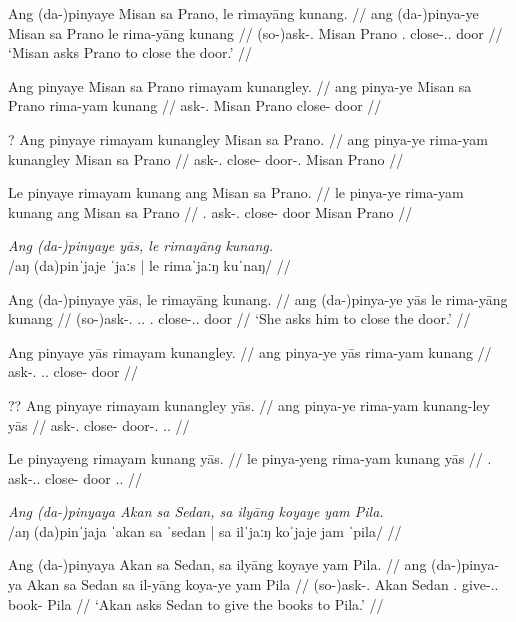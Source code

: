 \documentclass[12pt,a4paper]{scrartcl}
\newcommand{\PargI}{{\Parg}.{\Inan}}
\newcommand{\PatTI}{{\PatT}.{\Inan}}
\newcommand{\TsgM}{{\Tsg}.{\M}}
\newcommand{\TsgF}{{\Tsg}.{\F}}
\begin{document}
\gla Ang (da-)pinyaye Misan sa Prano, le rimayāng kunang. //
\glb ang (da-)pinya-ye Misan sa Prano le rima-yāng kunang //
\glc \AgtT{} (so-)ask-\TsgF{} Misan \Parg{} Prano \PatTI{} close-\TsgM{}.\Aarg{} door //
\glft `Misan asks Prano to close the door.' //
\endgl

\a\begingl
\gla Ang pinyaye Misan sa Prano rimayam kunangley. //
\glb ang pinya-ye Misan sa Prano rima-yam kunang //
\glc \AgtT{} ask-\TsgF{} Misan \Parg{} Prano close-\Ptcp{} door //
\endgl

\a\ljudge?\begingl
\gla Ang pinyaye rimayam kunangley Misan sa Prano. //
\glb ang pinya-ye rima-yam kunangley Misan sa Prano //
\glc \AgtT{} ask-\TsgF{} close-\Ptcp{} door-\PargI{} Misan \Parg{} Prano //
\endgl

\a\ljudge*\begingl
\gla Le pinyaye rimayam kunang ang Misan sa Prano. //
\glb le pinya-ye rima-yam kunang ang Misan sa Prano //
\glc \PargI{} ask-\TsgF{} close-\Ptcp{} door \Aarg{} Misan \Parg{} Prano //
\endgl
\xe

\pex
\a\begingl
\glpreamble \textit{Ang (da-)pinyaye yās, le rimayāng kunang.} \\
	/aŋ (da)pinˈjaje ˈjaːs | le rimaˈjaːŋ kuˈnaŋ/ //

\gla Ang (da-)pinyaye yās, le rimayāng kunang. //
\glb ang (da-)pinya-ye yās le rima-yāng kunang //
\glc \AgtT{} (so-)ask-\TsgF{} \TsgM{}.\Parg{} \PatTI{} close-\TsgM{}.\Aarg{} door //
\glft `She asks him to close the door.' //
\endgl

\a\begingl
\gla Ang pinyaye yās rimayam kunangley. //
\glb ang pinya-ye yās rima-yam kunang //
\glc \AgtT{} ask-\TsgF{} \TsgM{}.\Parg{} close-\Ptcp{} door //
\endgl

\a\ljudge??\begingl
\gla Ang pinyaye rimayam kunangley yās. //
\glb ang pinya-ye rima-yam kunang-ley yās //
\glc \AgtT{} ask-\TsgF{} close-\Ptcp{} door-\PargI{} \TsgM{}.\Parg{} //
\endgl

\a\ljudge*\begingl
\gla Le pinyayeng rimayam kunang yās. //
\glb le pinya-yeng rima-yam kunang yās //
\glc \PatTI{} ask-\TsgF{}.\Aarg{} close-\Ptcp{} door \TsgM{}.\Parg{} //
\endgl
\xe

\pex
\a\begingl
\glpreamble \textit{Ang (da-)pinyaya Akan sa Sedan, sa ilyāng koyaye yam Pila.} \\
	/aŋ (da)pinˈjaja ˈakan sa ˈsedan | sa ilˈjaːŋ koˈjaje jam ˈpila/ //

\gla Ang (da-)pinyaya Akan sa Sedan, sa ilyāng koyaye yam Pila. //
\glb ang (da-)pinya-ya Akan sa Sedan sa il-yāng koya-ye yam Pila //
\glc \AgtT{} (so-)ask-\TsgM{} Akan \Parg{} Sedan \PatTI{} give-\TsgM{}.\Aarg{} book-\Pl{} \Dat{} Pila //
\glft `Akan asks Sedan to give the books to Pila.' //
\endgl
\end{document}
